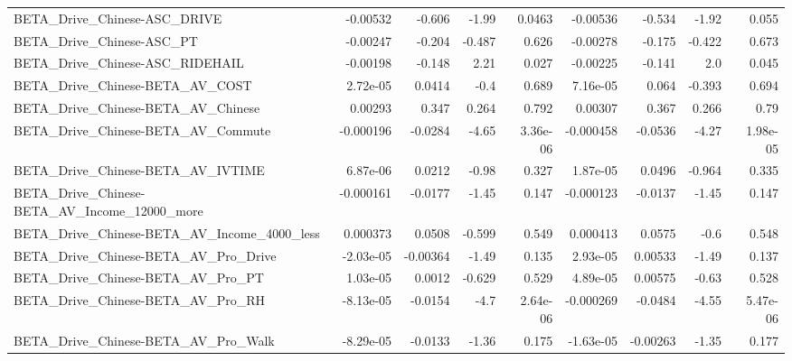 \begin{tabular}{lrrrrrrrr}
BETA\_Drive\_Chinese-ASC\_DRIVE                       &    -0.00532 &       -0.606 &     -1.99 &   0.0463 &   -0.00536 &      -0.534 &        -1.92 &         0.055 \\
BETA\_Drive\_Chinese-ASC\_PT                          &    -0.00247 &       -0.204 &    -0.487 &    0.626 &   -0.00278 &      -0.175 &       -0.422 &         0.673 \\
BETA\_Drive\_Chinese-ASC\_RIDEHAIL                    &    -0.00198 &       -0.148 &      2.21 &    0.027 &   -0.00225 &      -0.141 &          2.0 &         0.045 \\
BETA\_Drive\_Chinese-BETA\_AV\_COST                    &    2.72e-05 &       0.0414 &      -0.4 &    0.689 &   7.16e-05 &       0.064 &       -0.393 &         0.694 \\
BETA\_Drive\_Chinese-BETA\_AV\_Chinese                 &     0.00293 &        0.347 &     0.264 &    0.792 &    0.00307 &       0.367 &        0.266 &          0.79 \\
BETA\_Drive\_Chinese-BETA\_AV\_Commute                 &   -0.000196 &      -0.0284 &     -4.65 & 3.36e-06 &  -0.000458 &     -0.0536 &        -4.27 &      1.98e-05 \\
BETA\_Drive\_Chinese-BETA\_AV\_IVTIME                  &    6.87e-06 &       0.0212 &     -0.98 &    0.327 &   1.87e-05 &      0.0496 &       -0.964 &         0.335 \\
BETA\_Drive\_Chinese-BETA\_AV\_Income\_12000\_more       &   -0.000161 &      -0.0177 &     -1.45 &    0.147 &  -0.000123 &     -0.0137 &        -1.45 &         0.147 \\
BETA\_Drive\_Chinese-BETA\_AV\_Income\_4000\_less        &    0.000373 &       0.0508 &    -0.599 &    0.549 &   0.000413 &      0.0575 &         -0.6 &         0.548 \\
BETA\_Drive\_Chinese-BETA\_AV\_Pro\_Drive               &   -2.03e-05 &     -0.00364 &     -1.49 &    0.135 &   2.93e-05 &     0.00533 &        -1.49 &         0.137 \\
BETA\_Drive\_Chinese-BETA\_AV\_Pro\_PT                  &    1.03e-05 &       0.0012 &    -0.629 &    0.529 &   4.89e-05 &     0.00575 &        -0.63 &         0.528 \\
BETA\_Drive\_Chinese-BETA\_AV\_Pro\_RH                  &   -8.13e-05 &      -0.0154 &      -4.7 & 2.64e-06 &  -0.000269 &     -0.0484 &        -4.55 &      5.47e-06 \\
BETA\_Drive\_Chinese-BETA\_AV\_Pro\_Walk                &   -8.29e-05 &      -0.0133 &     -1.36 &    0.175 &  -1.63e-05 &    -0.00263 &        -1.35 &         0.177 \\

\end{tabular}
